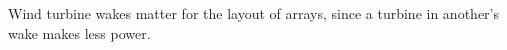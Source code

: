 Wind turbine wakes matter for the layout of arrays, since a turbine in
another's wake makes less power.
